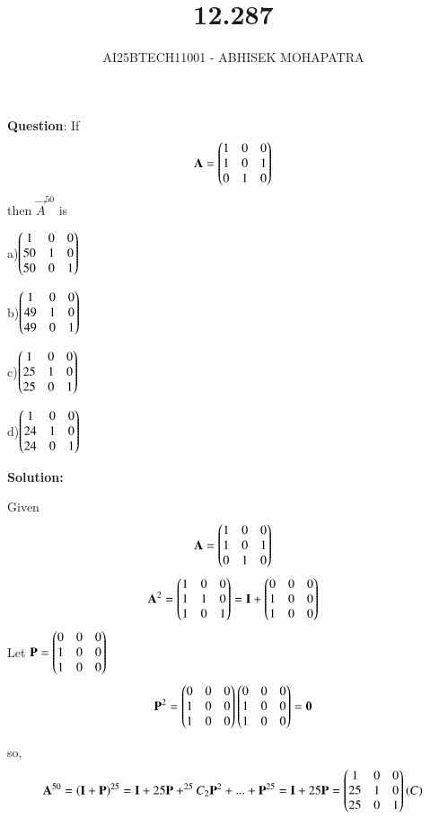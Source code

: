 \documentclass[journal,12pt,onecolumn]{IEEEtran}
\begin{document}
\title{12.287}
\author{AI25BTECH11001 - ABHISEK MOHAPATRA}
{\let\newpage\relax\maketitle}
	
	 	\textbf{Question}:
If$$\mathbf{A} = \begin{pmatrix}1&0&0\\1&0&1\\0&1&0\end{pmatrix}$$then $\vec{A}^{50}$ is

a)$\begin{pmatrix}1&0&0\\50&1&0\\50&0&1\end{pmatrix}$

b)$\begin{pmatrix}1&0&0\\49&1&0\\49&0&1\end{pmatrix}$

c)$\begin{pmatrix}1&0&0\\25&1&0\\25&0&1\end{pmatrix}$

d)$\begin{pmatrix}1&0&0\\24&1&0\\24&0&1\end{pmatrix}$

		\textbf{Solution:}

Given
\begin{align}
		\mathbf{A} = \begin{pmatrix}1&0&0\\1&0&1\\0&1&0\end{pmatrix}
\end{align}
\begin{align}
		\mathbf{A}^2 = \begin{pmatrix}1&0&0\\1&1&0\\1&0&1\end{pmatrix} = \mathbf{I} + \begin{pmatrix}0&0&0\\1&0&0\\1&0&0\end{pmatrix}
\end{align}
Let $\mathbf{P} =\begin{pmatrix}0&0&0\\1&0&0\\1&0&0\end{pmatrix} $ 
\begin{align}
		\mathbf{P}^2 = \begin{pmatrix}0&0&0\\1&0&0\\1&0&0\end{pmatrix}\begin{pmatrix}0&0&0\\1&0&0\\1&0&0\end{pmatrix} = \mathbf{0} 
\end{align}

so,
\begin{align}
	\mathbf{A}^{50} = \left(\mathbf{I}+\mathbf{P}\right)^{25} = \mathbf{I} + 25\mathbf{P} + ^{25}C_2\mathbf{P}^2 + ... + \mathbf{P}^{25} = \mathbf{I} + 25\mathbf{P} = \begin{pmatrix}1&0&0\\25&1&0\\25&0&1\end{pmatrix} (C)
\end{align}
\end{document}
